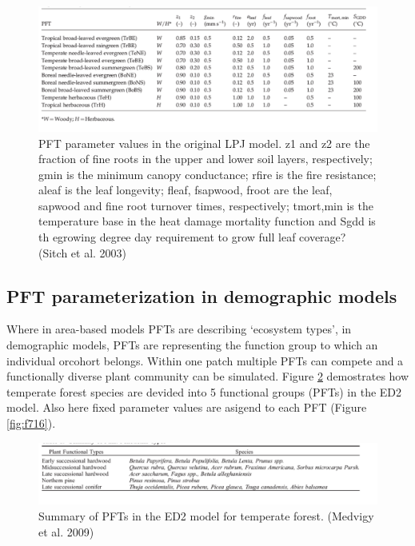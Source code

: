 \documentclass[12pt,oneside]{book}
\begin{document}
\begin{figure}

{\centering \includegraphics[width=1\linewidth]{figures/chap7/f714_LPJ_pft_table} 

}

\caption{PFT parameter values in the original LPJ model. z1 and z2 are the fraction of fine roots in the upper and lower soil layers, respectively; gmin is the minimum canopy conductance; rfire is the fire resistance; aleaf is the leaf longevity; fleaf, fsapwood, froot are the leaf, sapwood and fine root turnover times, respectively; tmort,min is the temperature base in the heat damage mortality function and Sgdd is th egrowing degree day requirement to grow full leaf coverage? (Sitch et al. 2003)}\label{fig:f714}
\end{figure}

\subsection{PFT parameterization in demographic
models}\label{pft-parameterization-in-demographic-models}

Where in area-based models PFTs are describing `ecosystem types', in
demographic models, PFTs are representing the function group to which an
individual orcohort belongs. Within one patch multiple PFTs can compete
and a functionally diverse plant community can be simulated. Figure
\ref{fig:f715} demostrates how temperate forest species are devided into
5 functional groups (PFTs) in the ED2 model. Also here fixed parameter
values are asigend to each PFT (Figure \ref{fig:f716}).

\begin{figure}

{\centering \includegraphics[width=1\linewidth]{figures/chap7/f715_ed2_pft_table} 

}

\caption{Summary of PFTs in the ED2 model for temperate forest. (Medvigy  et al. 2009)}\label{fig:f715}
\end{figure}
\end{document}
